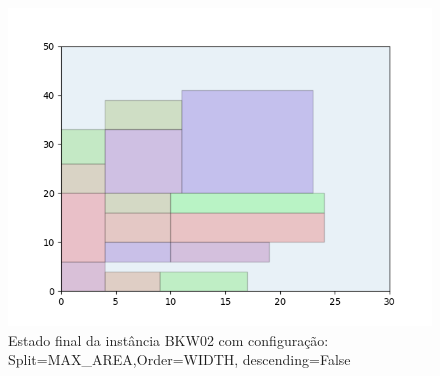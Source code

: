 \begin{figure}[H]
    \centering
    \caption[]{Estado final da instância BKW02 com configuração: Split=MAX_AREA,Order=WIDTH, descending=False}
    \label{fig:bkw02-max_area-width-false}
    \includegraphics[scale=0.5]{output/figures/bkw/bkw02/max_area/width/false/00}
\end{figure}